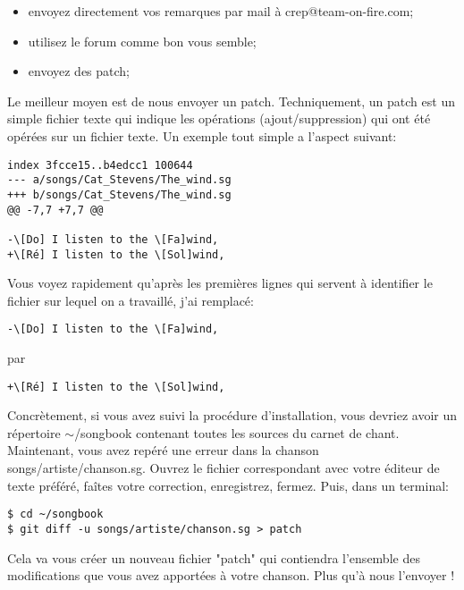 \documentclass[a4paper]{article}
\begin{document}
\begin{itemize}
\item envoyez directement vos remarques par mail à crep@team-on-fire.com;
\item utilisez le forum comme bon vous semble;
\item envoyez des patch;
\end{itemize}

Le meilleur moyen est de nous envoyer un patch. Techniquement, un
patch est un simple fichier texte qui indique les opérations
(ajout/suppression) qui ont été opérées sur un fichier texte. Un
exemple tout simple a l'aspect suivant:

\begin{verbatim}
index 3fcce15..b4edcc1 100644
--- a/songs/Cat_Stevens/The_wind.sg
+++ b/songs/Cat_Stevens/The_wind.sg
@@ -7,7 +7,7 @@

-\[Do] I listen to the \[Fa]wind,
+\[Ré] I listen to the \[Sol]wind,
\end{verbatim}

Vous voyez rapidement qu'après les premières lignes qui servent à
identifier le fichier sur lequel on a travaillé, j'ai remplacé:
\begin{verbatim}
-\[Do] I listen to the \[Fa]wind,
\end{verbatim}
par
\begin{verbatim}
+\[Ré] I listen to the \[Sol]wind,
\end{verbatim}

Concrètement, si vous avez suivi la procédure d'installation,
vous devriez avoir un répertoire $\sim$/songbook contenant toutes les
sources du carnet de chant. Maintenant, vous avez repéré une erreur
dans la chanson songs/artiste/chanson.sg. Ouvrez le fichier
correspondant avec votre éditeur de texte préféré, faîtes votre
correction, enregistrez, fermez. Puis, dans un terminal:

\begin{verbatim}
$ cd ~/songbook
$ git diff -u songs/artiste/chanson.sg > patch
\end{verbatim}

Cela va vous créer un nouveau fichier "patch" qui contiendra
l'ensemble des modifications que vous avez apportées à votre
chanson. Plus qu'à nous l'envoyer !
\end{document}
